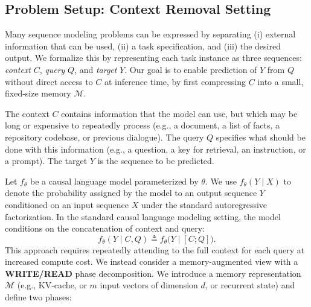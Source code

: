 \documentclass{article}
\theoremstyle{plain}
\theoremstyle{definition}
\theoremstyle{remark}
\begin{document}
\subsection{Problem Setup: Context Removal Setting}
\label{sec:problem_setup}
Many sequence modeling problems can be expressed by separating (i) external information that can be used, (ii) a task specification, and (iii) the desired output. We formalize this by representing each task instance as three sequences: \emph{context} $C$, \emph{query} $Q$, and \emph{target} $Y$. Our goal is to enable prediction of $Y$ from $Q$ without direct access to $C$ at inference time, by first compressing $C$ into a small, fixed-size memory $\mathcal{M}$. 

The context $C$ contains information that the model can use, but which may be long or expensive to repeatedly process (e.g., a document, a list of facts, a repository codebase, or previous dialogue). The query $Q$ specifies what should be done with this information (e.g., a question, a key for retrieval, an instruction, or a prompt). The target $Y$ is the sequence to be predicted. 

Let $f_\theta$ be a causal language model parameterized by $\theta$.
We use $f_\theta(Y \mid X)$ to denote the probability assigned by the model to an output sequence $Y$ conditioned on an input sequence $X$ under the standard autoregressive factorization.
In the standard causal language modeling setting, the model conditions on the concatenation of context and query:
\begin{equation}
f_\theta(Y \mid C, Q) \triangleq f_\theta\bigl(Y \mid [C;Q]\bigr).
\end{equation}
This approach requires repeatedly attending to the full context for each query at increased compute cost. We instead consider a memory-augmented view with a \textbf{WRITE/READ} phase decomposition.
We introduce a memory representation $\mathcal{M}$ (e.g., KV-cache, or $m$ input vectors of dimension $d$, or recurrent state) and define two phases:
\end{document}
